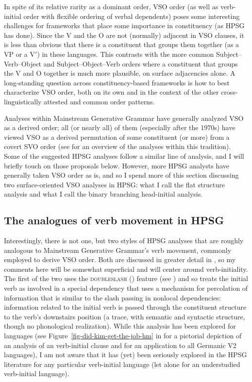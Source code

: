 \documentclass[output=paper
 	        ,biblatex
                ,babelshorthands
                ,newtxmath
                ,draftmode
                ,colorlinks, citecolor=brown
]{langscibook}
\begin{document}
In spite of its relative rarity as a dominant order, VSO order (as well as verb-initial order with flexible ordering of verbal dependents) poses some interesting challenges for frameworks that place some importance in constituency (as HPSG has done). Since the V and the O are not (normally) adjacent in VSO clauses, it is less than obvious that there is a constituent that groups them together (as a VP or a V$'$) in these languages. This contrasts with the more common Subject--Verb--Object and Subject--Object--Verb orders where a constituent that groups the V and O together is much more plausible, on surface adjacencies alone. A long-standing question across constituency-based frameworks is how to best characterize VSO order, both on its own and in the context of the other cross-linguistically attested and common order patterns.  

Analyses within Mainstream Generative Grammar have generally analyzed VSO as a derived order; all (or nearly all) of them (especially after the 1970s) have viewed VSO as a derived permutation of some constituent (or more) from a covert SVO order (see \citealt{clemenspolinsky17} for an overview of the analyses within this tradition). Some of the suggested HPSG analyses follow a similar line of analysis, and I will briefly touch on those proposals below. However, more HPSG analysts have generally taken VSO order as is, and so I spend more of this section discussing two surface-oriented VSO analyses in HPSG: what I call the flat structure analysis and what I call the binary branching head-initial analysis.  

\subsection{The analogues of verb movement in HPSG}

Interestingly, there is not one, but two styles of HPSG analyses that are roughly analogous to
Mainstream Generative Grammar's verb movement, commonly employed to derive VSO order. Both are
discussed in greater detail in , so my comments here will be somewhat
superficial and will center around verb-initiality. The first of the two uses the
\textsc{doubleslash} (\dsl{}) feature (see
) and so treats the initial verb as
involved in a special dependency that uses a mechanism for percolation of information that is
similar to the slash passing in nonlocal dependencies: information related to the initial verb is passed through the constituent
structure to the verb's downstairs position (a trace, with semantic and syntactic structure, though
no phonological realization). While this analysis has been explored for  languages
(see Figure~\ref{fig-did-kim-get-the-job-hm} in
 for a pictorial depiction of an analysis of an  verb-initial
clause and  for an application to all Germanic V2 languages), I am
not aware that it has (yet) been seriously explored in the HPSG literature for any particular
verb-initial language (let alone for an understudied verb-initial language).
\end{document}
